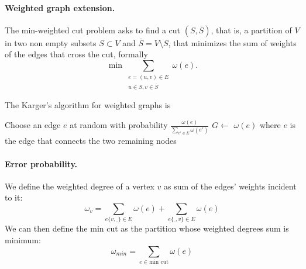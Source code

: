 \paragraph{Weighted graph extension.} The min-weighted cut problem asks to find a cut $(S, \overline{S})$, that is, a partition of $V$ in two non empty subsets $S \subset V$ and $\overline{S}=V \setminus S$, that minimizes the sum of weights of the edges that cross the cut, formally $$\min \sum_{\substack{e=(u,v)\in E \\ u \in S, v \in \overline{S}}} \omega(e).$$

The Karger's algorithm for weighted graphs is
\begin{algorithmic}[1]
	  \State Choose an edge $e$ at random with probability $\frac{\omega(e)}{\sum_{e' \in E} \omega(e')}$
	  \State $G \gets$ 
	\EndWhile
	\State \Return $\omega(e)$ where $e$ is the edge that connects the two remaining nodes
  \EndFunction
\end{algorithmic}

\paragraph{Error probability.} We define the weighted degree of a vertex $v$ as sum of the edges' weights incident to it:
\begin{equation*}
\omega_{v} = \sum_{e\{v, \_\} \in E}\omega(e) + \sum_{e\{\_, v\} \in E}\omega(e)
\end{equation*}
We can then define the min cut as the partition whose weighted degrees sum is minimum:
\begin{equation*}
\omega_{min} = \sum_{e \in \text{min cut}}\omega(e)
\end{equation*}

